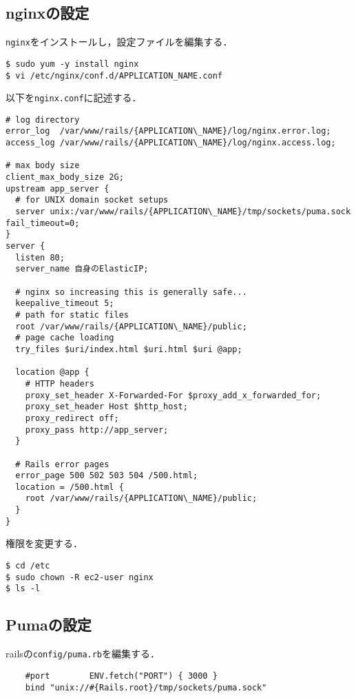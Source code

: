 \subsection{nginxの設定}
\texttt{nginx}をインストールし，設定ファイルを編集する．
\begin{screen}
    \texttt{\$ sudo yum -y install nginx}\\
    \texttt{\$ vi /etc/nginx/conf.d/APPLICATION\_NAME.conf}
\end{screen}
以下を\texttt{nginx.conf}に記述する．
\begin{screen}
    \begin{lstlisting}
# log directory
error_log  /var/www/rails/{APPLICATION\_NAME}/log/nginx.error.log; 
access_log /var/www/rails/{APPLICATION\_NAME}/log/nginx.access.log;

# max body size
client_max_body_size 2G;
upstream app_server {
  # for UNIX domain socket setups
  server unix:/var/www/rails/{APPLICATION\_NAME}/tmp/sockets/puma.sock fail_timeout=0; 
}
server {
  listen 80;
  server_name 自身のElasticIP;

  # nginx so increasing this is generally safe...
  keepalive_timeout 5;
  # path for static files
  root /var/www/rails/{APPLICATION\_NAME}/public;
  # page cache loading
  try_files $uri/index.html $uri.html $uri @app;

  location @app {
    # HTTP headers
    proxy_set_header X-Forwarded-For $proxy_add_x_forwarded_for;
    proxy_set_header Host $http_host;
    proxy_redirect off;
    proxy_pass http://app_server;
  }

  # Rails error pages
  error_page 500 502 503 504 /500.html;
  location = /500.html {
    root /var/www/rails/{APPLICATION\_NAME}/public; 
  }
}
\end{lstlisting}
\end{screen}
権限を変更する．
\begin{screen}
    \texttt{\$ cd /etc}\\
    \texttt{\$ sudo chown -R ec2-user nginx}\\
    \texttt{\$ ls -l}
\end{screen}

\subsection{Pumaの設定}
railsの\texttt{config/puma.rb}を編集する．
\begin{lstlisting}
    #port        ENV.fetch("PORT") { 3000 }
    bind "unix://#{Rails.root}/tmp/sockets/puma.sock"       
\end{lstlisting}

